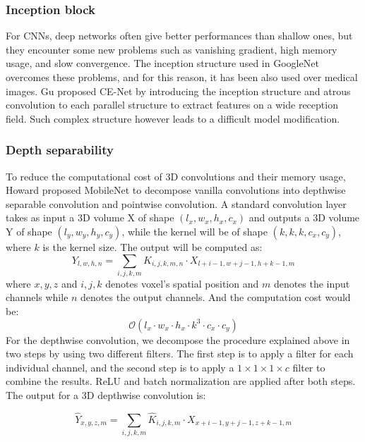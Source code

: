 \subsubsection{Inception block}
For CNNs, deep networks often give better performances than shallow ones, but
they encounter some new problems such as vanishing gradient, high memory usage,
and slow convergence. The inception structure used in GoogleNet
\cite{szegedy2015googlenet,szegedy2016rethinking} overcomes these problems, and
for this reason, it has been also used over medical images. Gu \etal
\cite{guan2019fully} proposed CE-Net by introducing the inception structure
and atrous convolution to each parallel structure to extract features on a
wide reception field. Such complex structure however leads to a difficult
model modification.

\subsubsection{Depth separability}
To reduce the computational cost of 3D convolutions and their memory usage,
Howard \etal \cite{howard2017mobilenets} proposed MobileNet to decompose
vanilla convolutions into depthwise separable convolution and pointwise
convolution.
A standard convolution layer takes as input a 3D volume X of shape
$(l_x, w_x, h_x, c_x)$ and outputs a 3D volume Y of shape
$(l_y, w_y, h_y, c_y)$, while the kernel will be of shape $(k, k, k, c_x, c_y)$,
where $k$ is the kernel size. The output will be computed as:
\begin{equation}
  Y_{l, w, h, n} = \sum_{i, j, k, m} K_{i, j, k, m, n} \cdot X_{l + i - 1, w + j - 1, h + k - 1, m}
\end{equation}
where $x, y, z$ and $i, j, k$ denotes voxel’s spatial position and $m$ denotes
the input channels while $n$ denotes the output channels. And the computation
cost would be:
\begin{equation}
  \label{eq:3dconv_complexity}
  \mathcal{O}(l_x \cdot w_x \cdot h_x \cdot k^3 \cdot c_x \cdot c_y)
\end{equation}
For the depthwise convolution, we decompose the procedure explained above in two
steps by using two different filters. The first step is to apply a filter for each
individual channel, and the second step is to apply a $1 \times 1 \times 1
\times c$ filter to combine the results. ReLU and batch normalization are
applied after both steps. The output for a 3D depthwise convolution is:

\begin{equation}
 \hat{Y}_{x,y,z,m} = \sum_{i,j,k,m} \hat{K}_{i,j,k,m} \cdot
 X_{x+i-1,y+j-1,z+k-1,m}
\end{equation}

